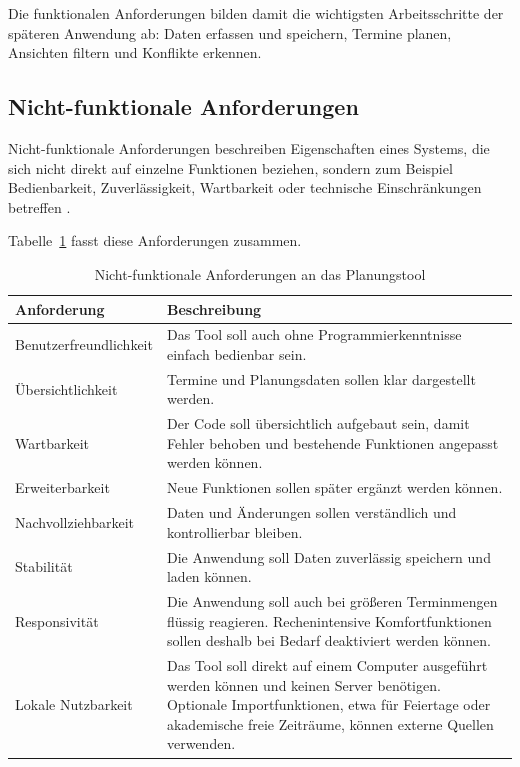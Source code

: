 \documentclass[12pt,a4paper]{article}
\begin{document}
Die funktionalen Anforderungen bilden damit die wichtigsten Arbeitsschritte der späteren Anwendung ab: Daten erfassen und speichern, Termine planen, Ansichten filtern und Konflikte erkennen.

\subsection{Nicht-funktionale Anforderungen}

Nicht-funktionale Anforderungen beschreiben Eigenschaften eines Systems, die sich nicht direkt auf einzelne Funktionen beziehen, sondern zum Beispiel Bedienbarkeit, Zuverlässigkeit, Wartbarkeit oder technische Einschränkungen betreffen \cite{sommerville2016software}.

Tabelle~\ref{tab:nichtfunktionale-anforderungen} fasst diese Anforderungen zusammen.

\begin{table}[H]
\centering
\caption{Nicht-funktionale Anforderungen an das Planungstool}
\label{tab:nichtfunktionale-anforderungen}
\begin{tabular}{|p{4.5cm}|p{8.5cm}|}
\hline
\textbf{Anforderung} & \textbf{Beschreibung} \\
\hline
Benutzerfreundlichkeit & Das Tool soll auch ohne Programmierkenntnisse einfach bedienbar sein. \\
\hline
Übersichtlichkeit & Termine und Planungsdaten sollen klar dargestellt werden. \\
\hline
Wartbarkeit & Der Code soll übersichtlich aufgebaut sein, damit Fehler behoben und bestehende Funktionen angepasst werden können. \\
\hline
Erweiterbarkeit & Neue Funktionen sollen später ergänzt werden können. \\
\hline
Nachvollziehbarkeit & Daten und Änderungen sollen verständlich und kontrollierbar bleiben. \\
\hline
Stabilität & Die Anwendung soll Daten zuverlässig speichern und laden können. \\
\hline
Responsivität & Die Anwendung soll auch bei größeren Terminmengen flüssig reagieren. Rechenintensive Komfortfunktionen sollen deshalb bei Bedarf deaktiviert werden können. \\
\hline
Lokale Nutzbarkeit & Das Tool soll direkt auf einem Computer ausgeführt werden können und keinen Server benötigen. Optionale Importfunktionen, etwa für Feiertage oder akademische freie Zeiträume, können externe Quellen verwenden. \\
\hline
\end{tabular}
\end{table}
\end{document}
